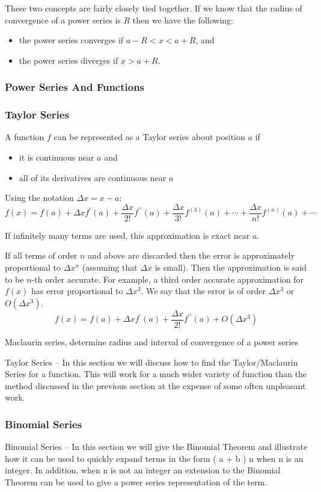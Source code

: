 These two concepts are fairly closely tied together. If we know that the radius of convergence of a power series is $R$ then we have the following:
\begin{itemize}
\item the power series converges if $a-R<x<a+R$, and
\item the power series diverges if $x>a+R$.
\end{itemize}

\subsubsection{Power Series And Functions}


\subsubsection{Taylor Series}
A function $f$ can be represented as a Taylor series about position $a$ if
\begin{itemize}
\item it is continuous near $a$ and
\item all of its derivatives are continuous near $a$
\end{itemize}

Using the notation $\Delta x = x-a$:
\[ f(x)=f(a)+\Delta xf^\prime(a)+\frac{\Delta x}{2!}f^{\prime\prime}(a) + \frac{\Delta x}{3!}f^{(3)}(a) + \cdots + \frac{\Delta x}{n!}f^{(n)}(a) + \cdots \]

If infinitely many terms are used, this approximation is exact near $a$.

If all terms of order $n$ and above are discarded then the error is approximately proportional to $\Delta x^n$ (assuming that $\Delta x$ is small). Then the approximation is said to be $n$-th order accurate. For example, a third order accurate approximation for $f(x)$ has error proportional to $\Delta x^3$. We say that  the error is of order $\Delta x^3$ or $O(\Delta x^3)$.
\[ f(x)=f(a)+\Delta xf^\prime(a)+\frac{\Delta x}{2!}f^{\prime\prime}(a) + O(\Delta x^3) \]


Maclaurin series,  determine radius and interval
of convergence of a power series


Taylor Series – In this section we will discuss how to find the Taylor/Maclaurin Series for a function. This will work for a much wider variety of function than the method discussed in the previous section at the expense of some often unpleasant work.

\subsubsection{Binomial Series}
Binomial Series – In this section we will give the Binomial Theorem and illustrate how it can be used to quickly expand terms in the form 
(
a
+
b
)
n
 when 
n
 is an integer. In addition, when 
n
 is not an integer an extension to the Binomial Theorem can be used to give a power series representation of the term.


